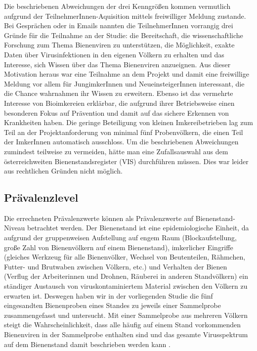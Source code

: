Die beschriebenen Abweichungen der drei Kenngrößen kommen vermutlich aufgrund der Teil\-nehmerInnen-Aquisition mittels freiwilliger Meldung zustande. Bei Gesprächen oder in Emails nannten die TeilnehmerInnen vorrangig drei Gründe für die Teilnahme an der Studie: die Bereitschaft, die wissenschaftliche Forschung zum Thema Bienenviren zu unterstützen, die Möglichkeit, exakte Daten über Virusinfektionen in den eigenen Völkern zu erhalten und das Interesse, sich Wissen über das Thema Bienenviren anzueignen. Aus dieser Motivation heraus war eine Teilnahme an dem Projekt und damit eine freiwillige Meldung vor allem für JungimkerInnen und NeueinsteigerInnen interessant, die die Chance wahrnahmen ihr Wissen zu erweitern. Ebenso ist das vermehrte Interesse von Bioimkereien erklärbar, die aufgrund ihrer Betriebsweise einen besonderen Fokus auf Prävention und damit auf das sichere Erkennen von Krankheiten haben. Die geringe Beteiligung von kleinen Imkereibetrieben lag zum Teil an der Projektanforderung von minimal fünf Probenvölkern, die einen Teil der ImkerInnen automatisch ausschloss. Um die beschriebenen Abweichungen zumindest teilweise zu vermeiden, hätte man eine Zufallsauswahl aus dem österreichweiten Bienenstandsregister (VIS) durchführen müssen. Dies war leider aus rechtlichen Gründen nicht möglich.

\subsection{Prävalenzlevel}

Die errechneten Prävalenzwerte können als Prävalenzwerte auf Bienenstand-Niveau betrachtet werden. Der Bienenstand ist eine epidemiologische Einheit, da aufgrund der gruppenweisen Aufstellung auf engem Raum (Blockaufstellung, große Zahl von Bienenvölkern auf einem Bienenstand), imkerlicher Eingriffe (gleiches Werkzeug für alle Bienenvölker, Wechsel von Beutenteilen, Rähmchen, Futter- und Brutwaben zwischen Völkern, etc.) und Verhalten der Bienen (Verflug der Arbeiterinnen und Drohnen, Räuberei in anderen Standvölkern) ein ständiger Austausch von viruskontaminiertem Material zwischen den Völkern zu erwarten ist. Deswegen haben wir in der vorliegenden Studie die fünf eingesandten Bienenproben eines Standes zu jeweils einer Sammelprobe zusammengefasst und untersucht. Mit einer Sammelprobe aus mehreren Völkern steigt die Wahrscheinlichkeit, dass alle häufig auf einem Stand vorkommenden Bienenviren in der Sammelprobe enthalten sind und das gesamte Virusspektrum auf dem Bienenstand damit beschrieben werden kann \citep{tentcheva2004,mouret2013}.

